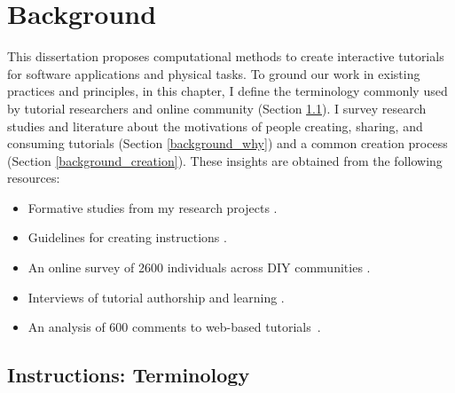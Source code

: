 
\chapter{Background}
\label{chapter_background}

This dissertation proposes computational methods to create interactive tutorials for software applications and physical tasks. To ground our work in existing practices and principles, in this chapter, I define the terminology commonly used by tutorial researchers and online community (Section \ref{background_terms}).
%
I survey research studies and literature about the motivations of people creating, sharing, and consuming tutorials (Section \ref{background_why}) and a common creation process (Section \ref{background_creation}).
%
These insights are obtained from the following resources:
\begin{itemize}
  \item Formative studies from my research projects \cite{Chi:2012:MAG:2380116.2380130,Chi:2014:DRS:2556288.2557254,Chi:2013:DGC:2501988.2502052}.
  \item Guidelines for creating instructions \cite{InstructableHowTo,wikiHowHowTo}.
  \item An online survey of 2600 individuals across DIY communities \cite{Kuznetsov:2010:REA:1868914.1868950}.
  \item Interviews of tutorial authorship and learning \cite{Torrey:2007he,Torrey:2009fc,Wakkary:2015:TAH:2702123.2702550,Tseng:2014:PVP:2598510.2598540}.
  \item An analysis of 600 comments to web-based tutorials~\cite{BenLafreniere:2013ux}.
\end{itemize}


\section{Instructions: Terminology}
\label{background_terms}

